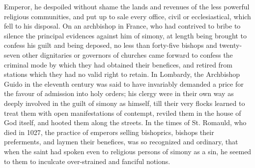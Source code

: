 Emperor, he despoiled without shame the lands and revenues of the less
powerful religious communities, and put up to sale every office, civil
or ecclesiastical, which fell to his disposal. On an archbishop in
France, who had contrived to bribe to silence the principal evidences
against him of simony, at length being brought to confess his guilt
and being deposed, no less than forty-five bishops and twenty-seven
other dignitaries or governors of churches came forward to confess the
criminal mode by which they had obtained their benefices, and retired
from stations which they had no valid right to retain. In Lombardy,
the Archbishop Guido in the eleventh century was said to have
invariably demanded a price for the favour of admission into holy
orders; his clergy were in their own way as deeply involved in the
guilt of simony as himself, till their very flocks learned to treat
them with open manifestations of contempt, reviled them in the house
of God itself, and hooted them along the streets. In the times of St.
Romauld, who died in 1027, the practice of emperors selling
bishoprics, bishops their preferments, and laymen their benefices, was
so recognized and ordinary, that when the saint had spoken even to
religious persons of simony as a sin, he seemed to them to inculcate
over-strained and fanciful notions.


